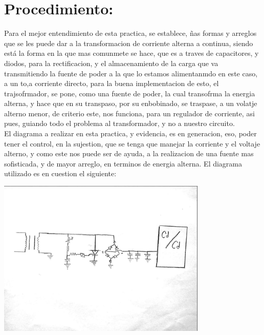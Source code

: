 \documentclass[12pt,a4paper]{article}
\begin{document}
\section{Procedimiento:}
Para el mejor entendimiento de esta practica, se establece, ñas formas y arreglos que se les puede dar a la transformacion de corriente alterna a continua, siendo está la forma en la que mas comunmete se hace, que es a traves de capacitores, y diodos, para la rectificacion, y el almacenamiento de la carga que va transmitiendo la fuente de poder a la que lo estamos alimentanmdo en este caso, a un to,a corriente directo, para la buena implementacion de esto, el trajsofrmador, se pone, como una fuente de poder, la cual transofrma la energia alterna, y hace que en su transpaso, por su enbobinado, se traspase, a un volatje alterno menor, de criterio este, nos funciona, para un regulador de corriente, asi pues, guiando todo el problema al transformador, y no a nuestro circuito.\\

El diagrama a realizar en esta practica, y evidencia, es en generacion, eso, poder tener el control, en la sujestion, que se tenga que manejar la corriente y el voltaje alterno, y como este nos puede ser de ayuda, a la realizacion de una fuente mas sofisticada, y de mayor arreglo, en terminos de energia alterna. El diagrama utilizado es en cuestion el siguiente:\\

\begin{center}
\includegraphics[width=10cm]{esquema.jpeg} 
\end{center}
\end{document}
